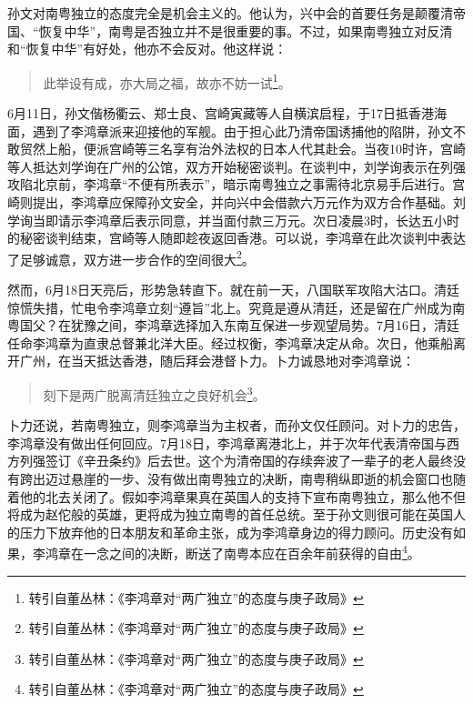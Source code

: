 孙文对南粤独立的态度完全是机会主义的。他认为，兴中会的首要任务是颠覆清帝国、“恢复中华”，南粤是否独立并不是很重要的事。不过，如果南粤独立对反清和“恢复中华”有好处，他亦不会反对。他这样说：

\begin{quote}
此举设有成，亦大局之福，故亦不妨一试\footnote{转引自董丛林：《李鸿章对“两广独立”的态度与庚子政局》}。
\end{quote}

6月11日，孙文偕杨衢云、郑士良、宫崎寅藏等人自横滨启程，于17日抵香港海面，遇到了李鸿章派来迎接他的军舰。由于担心此乃清帝国诱捕他的陷阱，孙文不敢贸然上船，便派宫崎等三名享有治外法权的日本人代其赴会。当夜10时许，宫崎等人抵达刘学询在广州的公馆，双方开始秘密谈判。在谈判中，刘学询表示在列强攻陷北京前，李鸿章“不便有所表示”，暗示南粤独立之事需待北京易手后进行。宫崎则提出，李鸿章应保障孙文安全，并向兴中会借款六万元作为双方合作基础。刘学询当即请示李鸿章后表示同意，并当面付款三万元。次日凌晨3时，长达五小时的秘密谈判结束，宫崎等人随即趁夜返回香港。可以说，李鸿章在此次谈判中表达了足够诚意，双方进一步合作的空间很大\footnote{转引自董丛林：《李鸿章对“两广独立”的态度与庚子政局》}。

然而，6月18日天亮后，形势急转直下。就在前一天，八国联军攻陷大沽口。清廷惊慌失措，忙电令李鸿章立刻“遵旨”北上。究竟是遵从清廷，还是留在广州成为南粤国父？在犹豫之间，李鸿章选择加入东南互保进一步观望局势。7月16日，清廷任命李鸿章为直隶总督兼北洋大臣。经过权衡，李鸿章决定从命。次日，他乘船离开广州，在当天抵达香港，随后拜会港督卜力。卜力诚恳地对李鸿章说：

\begin{quote}
刻下是两广脱离清廷独立之良好机会\footnote{转引自董丛林：《李鸿章对“两广独立”的态度与庚子政局》}。
\end{quote}

卜力还说，若南粤独立，则李鸿章当为主权者，而孙文仅任顾问。对卜力的忠告，李鸿章没有做出任何回应。7月18日，李鸿章离港北上，并于次年代表清帝国与西方列强签订《辛丑条约》后去世。这个为清帝国的存续奔波了一辈子的老人最终没有跨出迈过悬崖的一步、没有做出南粤独立的决断，南粤稍纵即逝的机会窗口也随着他的北去关闭了。假如李鸿章果真在英国人的支持下宣布南粤独立，那么他不但将成为赵佗般的英雄，更将成为独立南粤的首任总统。至于孙文则很可能在英国人的压力下放弃他的日本朋友和革命主张，成为李鸿章身边的得力顾问。历史没有如果，李鸿章在一念之间的决断，断送了南粤本应在百余年前获得的自由\footnote{转引自董丛林：《李鸿章对“两广独立”的态度与庚子政局》}。

